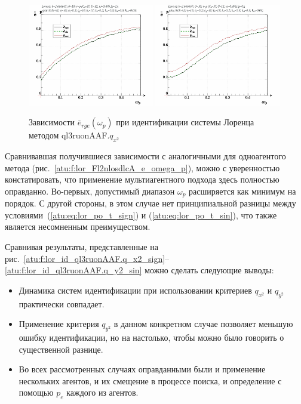\begin{figure}[ht!]
  \centerline{
    \includegraphics[width=0.49\textwidth]{p/cha/lor/ql3ruonAAF/lor_ql3ruonAAF_qx2-p_omega_p_e_sign.png}
    \hfill
    \includegraphics[width=0.49\textwidth]{p/cha/lor/ql3ruonAAF/lor_ql3ruonAAF_qx2-p_omega_p_e_sin.png}
  }
  \caption{Зависимости $\overline{e}_{rge}(\omega_p)$ при идентификации системы Лоренца методом ql3ruonAAF.$q_{x^2}$}
  \label{atu:f:lor_ql3ruonAAF_e_omega_p}
\end{figure}

Сравнивавшая получившиеся зависимости с аналогичными для одноагентого метода (рис.~\ref{atu:f:lor_Fl2nlosdlcA_e_omega_p}),
можно с уверенностью констатировать,
что применение мультиагентного подхода здесь полностью оправданно.
Во-первых, допустимый диапазон $\omega_p$ расширяется как минимум на порядок. %
С другой стороны, в этом случае нет принципиальной разницы между
условиями~(\ref{atu:eq:lor_po_t_sign}) и (\ref{atu:eq:lor_po_t_sin}),
что также является несомненным преимуществом.




Сравнивая результаты, представленные на рис.~\ref{atu:f:lor_id_ql3ruonAAF.q_x2_sign}--\ref{atu:f:lor_id_ql3ruonAAF.q_y2_sin}
можно сделать следующие выводы:

\begin{itemize}

  \item
    Динамика систем идентификации при использовании критериев $q_{x^2}$ и $q_{y^2}$
    практически совпадает.

  \item
    Применение критерия  $q_{y^2}$ в данном конкретном случае позволяет
    меньшую ошибку идентификации, но на настолько,
    чтобы можно было говорить о существенной разнице.

  \item
    Во всех рассмотренных случаях оправданными были и применение нескольких агентов,
    и их смещение в процессе поиска, и определение с помощью $p_e$
    каждого из агентов.

\end{itemize}

